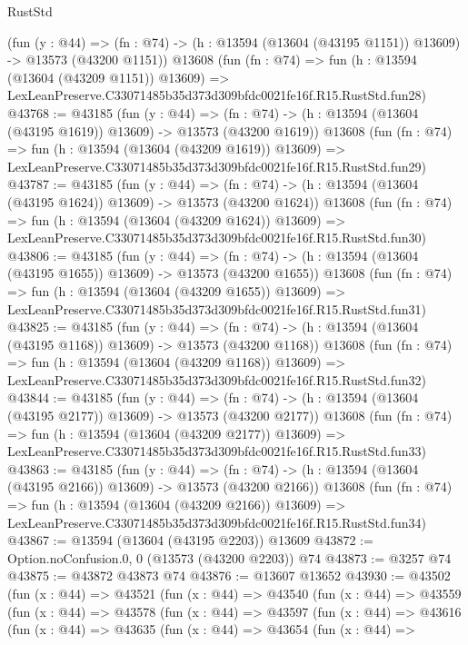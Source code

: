 \begin{lexlean}{RustStd}
\begin{coremodule}
    (fun (y : @44) =>
    (fn : @74) -> (h : @13594 (@13604 (@43195 @1151)) @13609) -> @13573 (@43200 @1151))
    @13608
    (fun (fn : @74) =>
    fun (h : @13594 (@13604 (@43209 @1151)) @13609) =>
    LexLeanPreserve.C33071485b35d373d309bfdc0021fe16f.R15.RustStd.fun28)
@43768 := @43185
    (fun (y : @44) =>
    (fn : @74) -> (h : @13594 (@13604 (@43195 @1619)) @13609) -> @13573 (@43200 @1619))
    @13608
    (fun (fn : @74) =>
    fun (h : @13594 (@13604 (@43209 @1619)) @13609) =>
    LexLeanPreserve.C33071485b35d373d309bfdc0021fe16f.R15.RustStd.fun29)
@43787 := @43185
    (fun (y : @44) =>
    (fn : @74) -> (h : @13594 (@13604 (@43195 @1624)) @13609) -> @13573 (@43200 @1624))
    @13608
    (fun (fn : @74) =>
    fun (h : @13594 (@13604 (@43209 @1624)) @13609) =>
    LexLeanPreserve.C33071485b35d373d309bfdc0021fe16f.R15.RustStd.fun30)
@43806 := @43185
    (fun (y : @44) =>
    (fn : @74) -> (h : @13594 (@13604 (@43195 @1655)) @13609) -> @13573 (@43200 @1655))
    @13608
    (fun (fn : @74) =>
    fun (h : @13594 (@13604 (@43209 @1655)) @13609) =>
    LexLeanPreserve.C33071485b35d373d309bfdc0021fe16f.R15.RustStd.fun31)
@43825 := @43185
    (fun (y : @44) =>
    (fn : @74) -> (h : @13594 (@13604 (@43195 @1168)) @13609) -> @13573 (@43200 @1168))
    @13608
    (fun (fn : @74) =>
    fun (h : @13594 (@13604 (@43209 @1168)) @13609) =>
    LexLeanPreserve.C33071485b35d373d309bfdc0021fe16f.R15.RustStd.fun32)
@43844 := @43185
    (fun (y : @44) =>
    (fn : @74) -> (h : @13594 (@13604 (@43195 @2177)) @13609) -> @13573 (@43200 @2177))
    @13608
    (fun (fn : @74) =>
    fun (h : @13594 (@13604 (@43209 @2177)) @13609) =>
    LexLeanPreserve.C33071485b35d373d309bfdc0021fe16f.R15.RustStd.fun33)
@43863 := @43185
    (fun (y : @44) =>
    (fn : @74) -> (h : @13594 (@13604 (@43195 @2166)) @13609) -> @13573 (@43200 @2166))
    @13608
    (fun (fn : @74) =>
    fun (h : @13594 (@13604 (@43209 @2166)) @13609) =>
    LexLeanPreserve.C33071485b35d373d309bfdc0021fe16f.R15.RustStd.fun34)
@43867 := @13594 (@13604 (@43195 @2203)) @13609
@43872 := Option.noConfusion.{0, 0} (@13573 (@43200 @2203)) @74
@43873 := @3257 @74
@43875 := @43872 @43873 @74
@43876 := @13607 @13652
@43930 := @43502
    (fun (x : @44) =>
    @43521
      (fun (x : @44) =>
      @43540
        (fun (x : @44) =>
        @43559
          (fun (x : @44) =>
          @43578
            (fun (x : @44) =>
            @43597
              (fun (x : @44) =>
              @43616
                (fun (x : @44) =>
                @43635
                  (fun (x : @44) =>
                  @43654
                    (fun (x : @44) =>

\end{coremodule}
\end{lexlean}
